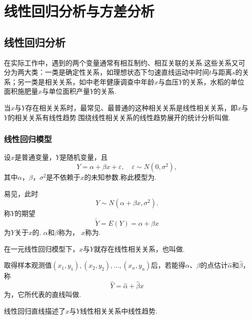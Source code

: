\chapter{线性回归分析与方差分析}
\section{线性回归分析}
在实际工作中，遇到的两个变量通常有相互制约、相互关联的关系.这些关系又可分为两大类：一类是确定性关系，如理想状态下匀速直线运动中时间\(t\)与距离\(s\)的关系；另一类是相关关系，如中老年健康调查中年龄\(x\)与血压\(Y\)的关系，水稻的单位面积施肥量\(x\)与单位面积产量\(Y\)的关系.

当\(x\)与\(Y\)存在相关关系时，最常见、最普通的这种相关关系是线性相关关系，即\(x\)与\(Y\)的相关关系有线性趋势.围绕线性相关关系的线性趋势展开的统计分析叫做.

\subsection{线性回归模型}
\begin{definition}
设\(x\)是普通变量，\(Y\)是随机变量，且\[
Y = \alpha + \beta x + \varepsilon,
\quad \varepsilon \sim N(0,\sigma^2),
\]其中\(\alpha\)，\(\beta\)，\(\sigma^2\)是不依赖于\(x\)的未知参数.称此模型为.

易见，此时\[
	Y \sim N(\alpha + \beta x,\sigma^2).
\]
称\(Y\)的期望\[
	\tilde{Y} = E(Y) = \alpha + \beta x
\]为\(Y\)关于\(x\)的.
\(\alpha\)和\(\beta\)称为，
\(x\)称为.

在一元线性回归模型下，\(x\)与\(Y\)就存在线性相关关系，也叫做.

取得样本观测值\((x_1,y_1),(x_2,y_2),\dotsc,(x_n,y_n)\)后，若能得\(\alpha\)、\(\beta\)的点估计\(\hat{\alpha}\)和\(\hat{\beta}\)，称\[
\hat{Y} = \hat{\alpha} + \hat{\beta} x
\]为，它所代表的直线叫做.
\end{definition}
线性回归直线描述了\(x\)与\(Y\)线性相关关系中线性趋势.

